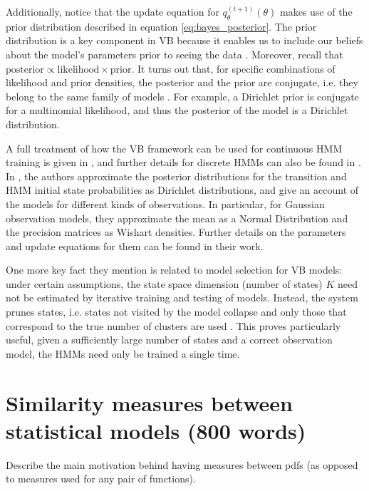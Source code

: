 \documentclass[../main.tex]{subfiles}
\begin{document}
\par Additionally, notice that the update equation for $q_{\theta}^{(t+1)}(\theta)$ makes use of the prior distribution described in equation \ref{eq:bayes_posterior}. The prior distribution is a key component in VB because it enables us to include our beliefs about the model's parameters prior to seeing the data \cite{Genovese2004}. Moreover, recall that $\text{posterior} \propto \text{likelihood} \times \text{prior}$. It turns out that, for specific combinations of likelihood and prior densities, the posterior and the prior are conjugate, i.e. they belong to the same family of models \cite{Rezek2005}. For example, a Dirichlet prior is conjugate for a multinomial likelihood, and thus the posterior of the model is a Dirichlet distribution. 
\par A full treatment of how the VB framework can be used for continuous HMM training is given in \cite{Rezek2005}, and further details for discrete HMMs can also be found in \cite{Beal2001,MacKay1997}. In \cite{Rezek2005}, the authors approximate the posterior distributions for the transition and HMM initial state probabilities as Dirichlet distributions, and give an account of the models for different kinds of observations. In particular, for Gaussian observation models, they approximate the mean as a Normal Distribution and the precision matrices as Wishart densities. Further details on the parameters and update equations for them can be found in their work.
\par One more key fact they mention is related to model selection for VB models: under certain assumptions, the state space dimension (number of states) $K$ need not be estimated by iterative training and testing of models. Instead, the system prunes states, i.e. states not visited by the model collapse and only those that correspond to the true number of clusters are used \cite{Rezek2005}. This proves particularly useful, given a sufficiently large number of states and a correct observation model, the HMMs need only be trained a single time.




\section{ Similarity measures between statistical models (800 words)} \label{section_similarity}
Describe the main motivation behind having measures between pdfs (as opposed to measures used for any pair of functions).
\end{document}
